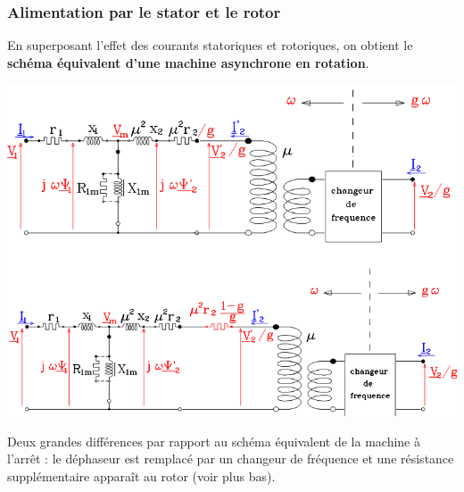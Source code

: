 		\subsubsection{Alimentation par le stator et le rotor}
		En superposant l'effet des courants statoriques et rotoriques, on obtient le 
		\textbf{schéma équivalent d'une machine asynchrone en rotation}.
		\begin{center}
		\includegraphics[scale=0.5]{ch5/image25.png}
		\end{center}
		Deux grandes différences par rapport au schéma équivalent de la machine à 
		l'arrêt : le déphaseur est remplacé par un changeur de fréquence et une 
		résistance supplémentaire apparaît au rotor (voir plus bas).
		
		\newpage

